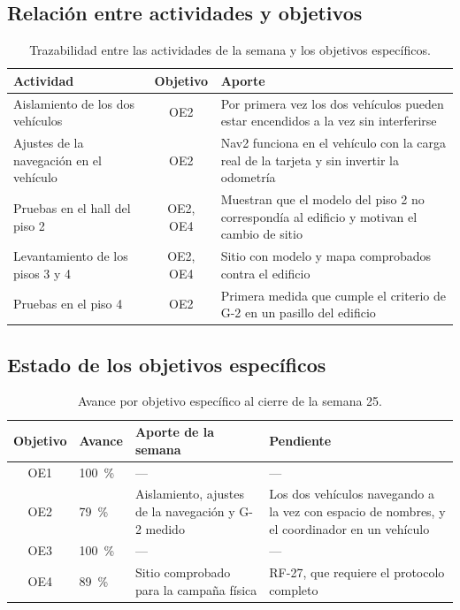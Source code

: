 \documentclass[12pt,letterpaper]{article}
\begin{document}
\subsection{Relación entre actividades y objetivos}

\begin{table}[H]
    \centering
    \small
    \caption{Trazabilidad entre las actividades de la semana y los objetivos específicos.}
    \label{tab:trazabilidad}
    \begin{tabular}{@{}p{4.6cm}cp{7.2cm}@{}}
        \toprule
        \textbf{Actividad} & \textbf{Objetivo} & \textbf{Aporte} \\ \midrule
        Aislamiento de los dos vehículos & OE2 & Por primera vez los dos vehículos pueden estar encendidos a la vez sin interferirse \\ \addlinespace
        Ajustes de la navegación en el vehículo & OE2 & Nav2 funciona en el vehículo con la carga real de la tarjeta y sin invertir la odometría \\ \addlinespace
        Pruebas en el hall del piso 2 & OE2, OE4 & Muestran que el modelo del piso 2 no correspondía al edificio y motivan el cambio de sitio \\ \addlinespace
        Levantamiento de los pisos 3 y 4 & OE2, OE4 & Sitio con modelo y mapa comprobados contra el edificio \\ \addlinespace
        Pruebas en el piso 4 & OE2 & Primera medida que cumple el criterio de G-2 en un pasillo del edificio \\ \bottomrule
    \end{tabular}
\end{table}

\subsection{Estado de los objetivos específicos}

\begin{table}[H]
    \centering
    \small
    \caption{Avance por objetivo específico al cierre de la semana 25.}
    \label{tab:objetivos}
    \begin{tabular}{@{}cp{1.8cm}p{5.0cm}p{5.4cm}@{}}
        \toprule
        \textbf{Objetivo} & \textbf{Avance} & \textbf{Aporte de la semana} & \textbf{Pendiente} \\ \midrule
        OE1 & 100~\% & --- & --- \\ \addlinespace
        OE2 & 79~\% & Aislamiento, ajustes de la navegación y G-2 medido & Los dos vehículos navegando a la vez con espacio de nombres, y el coordinador en un vehículo \\ \addlinespace
        OE3 & 100~\% & --- & --- \\ \addlinespace
        OE4 & 89~\% & Sitio comprobado para la campaña física & RF-27, que requiere el protocolo completo \\ \bottomrule
    \end{tabular}
\end{table}
\end{document}

